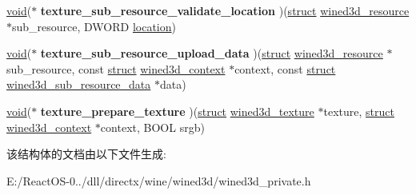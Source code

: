 \begin{DoxyCompactItemize}
\item 
\mbox{\label{structwined3d__texture__ops_a8e8ca4a15f366da0f0dacb0d90cf13e6}} 
\hyperlink{interfacevoid}{void}($\ast$ {\bfseries texture\+\_\+sub\+\_\+resource\+\_\+validate\+\_\+location} )(\hyperlink{interfacestruct}{struct} \hyperlink{structwined3d__resource}{wined3d\+\_\+resource} $\ast$sub\+\_\+resource, D\+W\+O\+RD \hyperlink{structlocation}{location})
\item 
\mbox{\label{structwined3d__texture__ops_a1bd5603958b8618243b9a3405ab48f24}} 
\hyperlink{interfacevoid}{void}($\ast$ {\bfseries texture\+\_\+sub\+\_\+resource\+\_\+upload\+\_\+data} )(\hyperlink{interfacestruct}{struct} \hyperlink{structwined3d__resource}{wined3d\+\_\+resource} $\ast$sub\+\_\+resource, const \hyperlink{interfacestruct}{struct} \hyperlink{structwined3d__context}{wined3d\+\_\+context} $\ast$context, const \hyperlink{interfacestruct}{struct} \hyperlink{structwined3d__sub__resource__data}{wined3d\+\_\+sub\+\_\+resource\+\_\+data} $\ast$data)
\item 
\mbox{\label{structwined3d__texture__ops_a6644a640c82d1ae6e93fde0575f74fbd}} 
\hyperlink{interfacevoid}{void}($\ast$ {\bfseries texture\+\_\+prepare\+\_\+texture} )(\hyperlink{interfacestruct}{struct} \hyperlink{structwined3d__texture}{wined3d\+\_\+texture} $\ast$texture, \hyperlink{interfacestruct}{struct} \hyperlink{structwined3d__context}{wined3d\+\_\+context} $\ast$context, B\+O\+OL srgb)
\end{DoxyCompactItemize}


该结构体的文档由以下文件生成\+:\begin{DoxyCompactItemize}
\item 
E\+:/\+React\+O\+S-\/0../dll/directx/wine/wined3d/wined3d\+\_\+private.\+h\end{DoxyCompactItemize}
